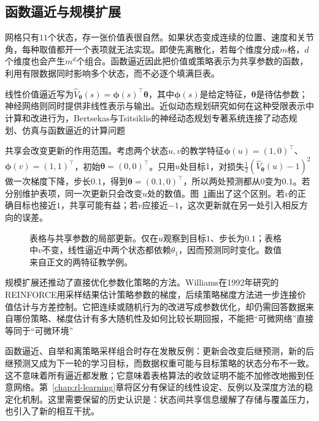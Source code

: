 \subsection{函数逼近与规模扩展}
\label{sec:rl-overview-approximation}

网格只有$11$个状态，存一张价值表很自然。如果状态变成连续的位置、速度和关节角，每种取值都开一个表项就无法实现。即使先离散化，若每个维度分成$m$格，$d$个维度也会产生$m^d$个组合。函数逼近因此把价值或策略表示为共享参数的函数，利用有限数据同时影响多个状态，而不必逐个填满巨表。

线性价值逼近写为$\widehat V_{\bm\theta}(s)=\bm\phi(s)^\top\bm\theta$，其中$\bm\phi(s)$是给定特征，$\bm\theta$是待估参数；神经网络则同时提供非线性表示与输出。近似动态规划研究如何在这种受限表示中计算和改进行为，Bertsekas与Tsitsiklis的神经动态规划专著系统连接了动态规划、仿真与函数逼近的计算问题

共享会改变更新的作用范围。考虑两个状态$u,v$的教学特征$\bm\phi(u)=(1,0)^\top$、$\bm\phi(v)=(1,1)^\top$，初始$\bm\theta=(0,0)^\top$。只用$u$处目标$1$，对损失$\tfrac12(\widehat V_{\bm\theta}(u)-1)^2$做一次梯度下降，步长$0.1$，得到$\bm\theta=(0.1,0)^\top$，所以两处预测都从$0$变为$0.1$。若分别维护表项，同一次更新只会改变$u$处的数值。图~\ref{fig:rl-overview-approximation}画出了这个区别。若$v$的正确目标也接近$1$，共享可能有益；若$v$应接近$-1$，这次更新就在另一处引入相反方向的误差。

\begin{figure}[htbp]
  \centering
  
  \caption{表格与共享参数的局部更新。仅在$u$观察到目标$1$、步长为$0.1$；表格中$v$不变，线性逼近中两个状态都依赖$\theta_1$，因而预测同时变化。数值来自正文的两特征教学例。}
  \label{fig:rl-overview-approximation}
\end{figure}

规模扩展还推动了直接优化参数化策略的方法。Williams在1992年研究的REINFORCE用采样结果估计策略参数的梯度，后续策略梯度方法进一步连接价值估计与方差控制。它把连续或随机行为的改进写成参数优化，却仍需回答数据来自哪份策略、梯度估计有多大随机性及如何比较长期回报，不能把“可微网络”直接等同于“可微环境”

函数逼近、自举和离策略采样组合时存在发散反例：更新会改变后继预测，新的后继预测又成为下一轮的学习目标，而数据权重可能与目标策略的状态分布不一致。这不意味着所有逼近都发散；它意味着表格算法的收敛证明不能不加修改地搬到任意网络。第~\ref{chap:rl-learning}章将区分有保证的线性设定、反例以及深度方法的稳定化机制。这里需要保留的历史认识是：状态间共享信息缓解了存储与覆盖压力，也引入了新的相互干扰。

